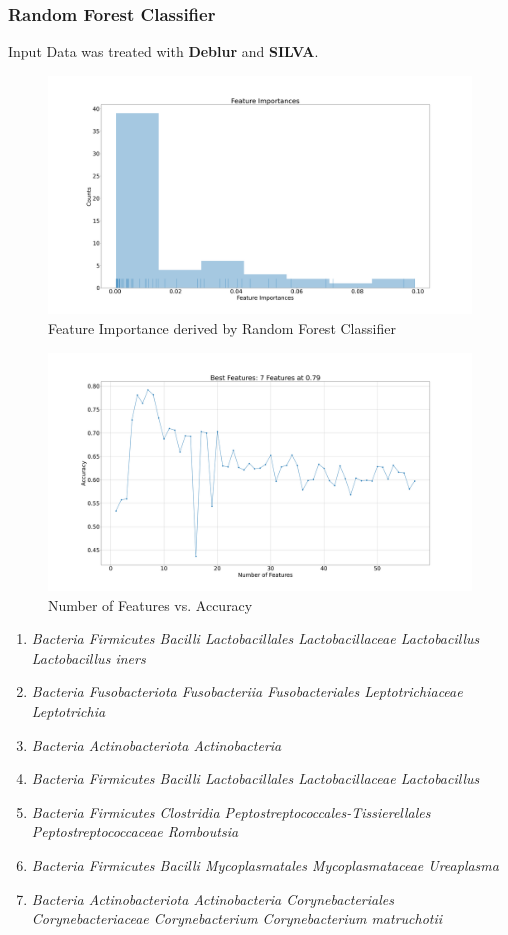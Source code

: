 \documentclass{beamer}
\begin{document}
    \begin{frame}[allowframebreaks]
        \frametitle{Random Forest Classifier}

        Input Data was treated with \textbf{Deblur} and \textbf{SILVA}.

        \begin{figure}[h!]
            \includegraphics[width=0.8 \linewidth]{figures/RandomForest/case1/importances.png}
            \caption{Feature Importance derived by Random Forest Classifier}
        \end{figure}

        \begin{figure}[h!]
            \includegraphics[width=0.8 \linewidth]{figures/RandomForest/case1/scores.png}
            \caption{Number of Features vs. Accuracy}
        \end{figure}

        \begin{enumerate}
            \item \textit{Bacteria Firmicutes Bacilli Lactobacillales Lactobacillaceae Lactobacillus Lactobacillus iners}
            \item \textit{Bacteria Fusobacteriota Fusobacteriia Fusobacteriales Leptotrichiaceae Leptotrichia}
            \item \textit{Bacteria Actinobacteriota Actinobacteria}
            \item \textit{Bacteria Firmicutes Bacilli Lactobacillales Lactobacillaceae Lactobacillus}
            \item \textit{Bacteria Firmicutes Clostridia Peptostreptococcales-Tissierellales Peptostreptococcaceae Romboutsia}
            \item \textit{Bacteria Firmicutes Bacilli Mycoplasmatales Mycoplasmataceae Ureaplasma}
            \item \textit{Bacteria Actinobacteriota Actinobacteria Corynebacteriales Corynebacteriaceae Corynebacterium Corynebacterium matruchotii}
        \end{enumerate}


\end{frame}
\end{document}
